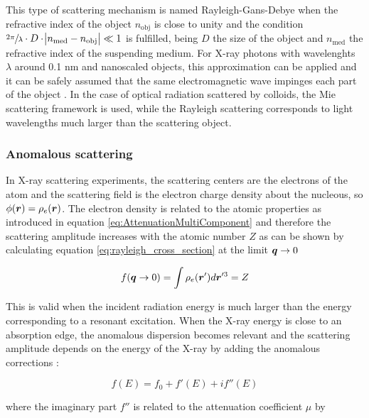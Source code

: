 This type of scattering mechanism is named Rayleigh-Gans-Debye when the refractive index of the object $n_{\text{obj}}$ is close to unity and the condition $\sfrac{2\pi}{\lambda} \cdot D \cdot  \abs{n_{\text{med}} - n_{\text{obj}}} \ll 1$ is fulfilled, being $D$ the size of the object and $n_{\text{med}}$ the refractive index of the suspending medium. For X-ray photons with wavelenghts $\lambda$ around 0.1 nm and nanoscaled objects, this approximation can be applied and it can be safely assumed that the same electromagnetic wave impinges each part of the object \citep{hulst_light_1957, barber_rayleigh-gans-debye_1978}. In the case of optical radiation scattered by colloids, the Mie scattering framework is used, while the Rayleigh scattering corresponds to light wavelengths much larger than the scattering object.

\subsubsection{Anomalous scattering}

In X-ray scattering experiments, the scattering centers are the electrons of the atom and the scattering field is the electron charge density about the nucleous, so $\phi(\bm{r})=\rho_e(\bm{r})$. The electron density is related to the atomic properties as introduced in equation \ref{eq:AttenuationMultiComponent} and therefore the scattering amplitude increases with the atomic number $Z$ as can be shown by calculating equation \ref{eq:rayleigh_cross_section} at the limit $\bm{q} \rightarrow 0$

\begin{equation}
        f(\bm{q} \rightarrow 0) = \int \rho_e(\bm{r}')  d\bm{r}'^3 = Z
\end{equation}

This is valid when the incident radiation energy is much larger than the energy corresponding to a resonant excitation. When the X-ray energy is close to an absorption edge, the anomalous dispersion becomes relevant and the scattering amplitude depends on the energy of the X-ray by adding the anomalous corrections \citep{als-nielsen_elements_2011}:

\begin{equation}
        f(E) = f_0 + f'(E) + i f'' (E)
\end{equation}

where the imaginary part $f''$ is related to the attenuation coefficient $\mu$ by \citep{feigin_structure_1987}

